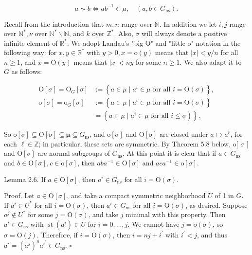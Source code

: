 \documentclass[10pt]{article}
\begin{document}
$$
a \sim b \Longleftrightarrow a b^{-1} \in \mu, \quad\left(a, b \in G_{\mathrm{ns}}\right) .
$$

Recall from the introduction that $m, n$ range over $\mathbb{N}$. In addition we let $i, j$ range over $\mathbb{N}^{*}, \nu$ over $\mathbb{N}^{*} \backslash \mathbb{N}$, and $k$ over $\mathbb{Z}^{*}$. Also, $\sigma$ will always denote a positive infinite element of $\mathbb{R}^{*}$. We adopt Landau's "big O" and "little o" notation in the following way: for $x, y \in \mathbb{R}^{*}$ with $y>0, x=\mathrm{o}(y)$ means that $|x|<y / n$ for all $n \geq 1$, and $x=\mathrm{O}(y)$ means that $|x|<n y$ for some $n \geq 1$. We also adapt it to $G$ as follows:

$$
\begin{aligned}
\mathrm{O}[\sigma]=\mathrm{O}_{G}[\sigma] & :=\left\{a \in \mu \mid a^{i} \in \mu \text { for all } i=\mathrm{O}(\sigma)\right\}, \\
\mathrm{o}[\sigma]=\mathrm{o}_{G}[\sigma] & :=\left\{a \in \mu \mid a^{i} \in \mu \text { for all } i=\mathrm{O}(\sigma)\right\} \\
& \left.=\left\{a \in \mu \mid a^{i} \in \mu \text { for all } i \leq \sigma\right)\right\} .
\end{aligned}
$$

So $\mathrm{o}[\sigma] \subseteq \mathrm{O}[\sigma] \subseteq \boldsymbol{\mu} \subseteq G_{\mathrm{ns}}$, and $\mathrm{o}[\sigma]$ and $\mathrm{O}[\sigma]$ are closed under $a \mapsto a^{\ell}$, for each $\ell \in \mathbb{Z}$; in particular, these sets are symmetric. By Theorem 5.8 below, o[ $\sigma$ ] and $\mathrm{O}[\sigma]$ are normal subgroups of $G_{\mathrm{ns}}$. At this point it is clear that if $a \in G_{\mathrm{ns}}$ and $b \in \mathrm{O}[\sigma], c \in \mathrm{o}[\sigma]$, then $a b a^{-1} \in \mathrm{O}[\sigma]$ and $a c a^{-1} \in \mathrm{o}[\sigma]$.

Lemma 2.6. If $a \in \mathrm{O}[\sigma]$, then $a^{i} \in G_{\mathrm{ns}}$ for all $i=\mathrm{O}(\sigma)$.

Proof. Let $a \in \mathrm{O}[\sigma]$, and take a compact symmetric neighborhood $U$ of 1 in $G$. If $a^{i} \in U^{*}$ for all $i=\mathrm{O}(\sigma)$, then $a^{i} \in G_{\mathrm{ns}}$ for all $i=\mathrm{O}(\sigma)$, as desired. Suppose $a^{j} \notin U^{*}$ for some $j=\mathrm{O}(\sigma)$, and take $j$ minimal with this property. Then $a^{i} \in G_{\mathrm{ns}}$ with $\operatorname{st}\left(a^{i}\right) \in U$ for $i=0, \ldots, j$. We cannot have $j=\mathrm{o}(\sigma)$, so $\sigma=\mathrm{O}(j)$. Therefore, if $i=\mathrm{O}(\sigma)$, then $i=n j+i^{\prime}$ with $i^{\prime}<j$, and thus $a^{i}=\left(a^{j}\right)^{n} a^{i^{\prime}} \in G_{\mathrm{ns}}$. \(\square\)
\end{document}
